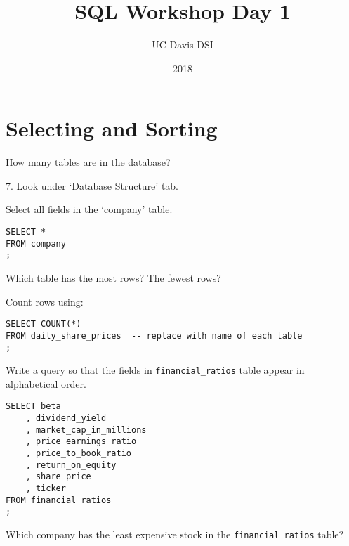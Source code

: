 \documentclass[10pt]{exam}
\begin{document}
 
\title{SQL Workshop Day 1}
\author{UC Davis DSI}
\date{2018}

\maketitle

\section{Selecting and Sorting}

\begin{questions}

\question How many tables are in the database?

\begin{solution}
    7. Look under `Database Structure' tab.
\end{solution}


\question Select all fields in the `company' table.

\begin{solution}
\begin{lstlisting}
SELECT *
FROM company
;
\end{lstlisting}
\end{solution}


\question Which table has the most rows? The fewest rows?

\begin{solution}

    Count rows using:

\begin{lstlisting}
SELECT COUNT(*)
FROM daily_share_prices  -- replace with name of each table
;
\end{lstlisting}
\end{solution}


\question Write a query so that the fields in \texttt{financial\_ratios} table
appear in alphabetical order.

\begin{solution}
\begin{lstlisting}
SELECT beta
    , dividend_yield
    , market_cap_in_millions
    , price_earnings_ratio
    , price_to_book_ratio
    , return_on_equity
    , share_price
    , ticker
FROM financial_ratios
;
\end{lstlisting}
\end{solution}


    \question Which company has the least expensive stock in the
    \texttt{financial\_ratios} table?


\end{questions}
\end{document}

